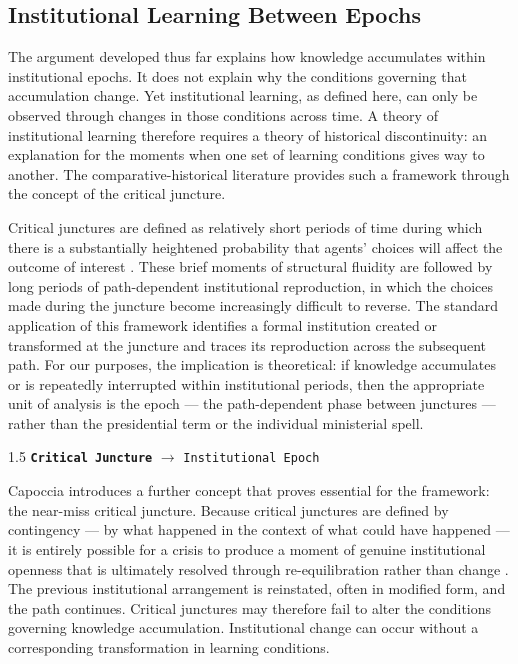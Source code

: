 \documentclass[doc, 12pt, a4paper,floatsintext]{apa7}
\begin{document}
\subsection{Institutional Learning Between Epochs}

The argument developed thus far explains how knowledge accumulates within institutional epochs. It does not explain why the conditions governing that accumulation change. Yet institutional learning, as defined here, can only be observed through changes in those conditions across time. A theory of institutional learning therefore requires a theory of historical discontinuity: an explanation for the moments when one set of learning conditions gives way to another. The comparative-historical literature provides such a framework through the concept of the critical juncture.

Critical junctures are defined as relatively short periods of time during which there is a substantially heightened probability that agents' choices will affect the outcome of interest \parencite[348]{capoccia_study_2007}. These brief moments of structural fluidity are followed by long periods of path-dependent institutional reproduction, in which the choices made during the juncture become increasingly difficult to reverse. The standard application of this framework identifies a formal institution created or transformed at the juncture and traces its reproduction across the subsequent path. For our purposes, the implication is theoretical: if knowledge accumulates or is repeatedly interrupted within institutional periods, then the appropriate unit of analysis is the epoch --- the path-dependent phase between junctures --- rather than the presidential term or the individual ministerial spell.

\begin{spacing}{1.5}
\noindent
\texttt{\bf Critical Juncture}
$\rightarrow$
\texttt{Institutional Epoch}
\end{spacing}

Capoccia introduces a further concept that proves essential for the framework: the near-miss critical juncture. Because critical junctures are defined by contingency --- by what happened in the context of what could have happened --- it is entirely possible for a crisis to produce a moment of genuine institutional openness that is ultimately resolved through re-equilibration rather than change \parencite[350--351]{capoccia_study_2007}. The previous institutional arrangement is reinstated, often in modified form, and the path continues. Critical junctures may therefore fail to alter the conditions governing knowledge accumulation. Institutional change can occur without a corresponding transformation in learning conditions.
\end{document}
